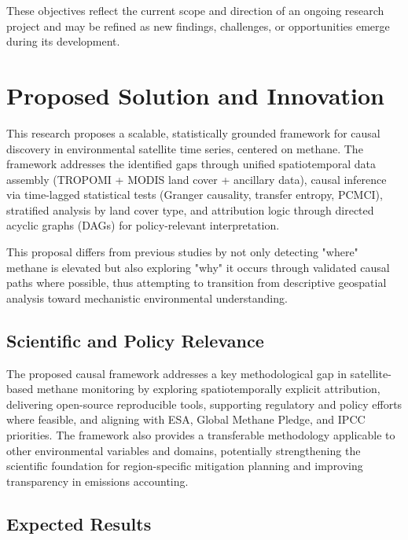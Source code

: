 These objectives reflect the current scope and direction of an ongoing research project and may be refined as new findings, challenges, or opportunities emerge during its development.


\section{Proposed Solution and Innovation}
\label{subsec:proposed-solution}

This research proposes a scalable, statistically grounded framework for causal discovery in environmental satellite time series, centered on methane. The framework addresses the identified gaps through unified spatiotemporal data assembly (TROPOMI  + MODIS land cover + ancillary data), causal inference via time-lagged statistical tests (Granger causality, transfer entropy, PCMCI), stratified analysis by land cover type, and attribution logic through directed acyclic graphs (DAGs) for policy-relevant interpretation.

This proposal differs from previous studies by not only detecting "where" methane is elevated but also exploring "why" it occurs through validated causal paths where possible, thus attempting to transition from descriptive geospatial analysis toward mechanistic environmental understanding.

\subsection{Scientific and Policy Relevance}
\label{subsec:scientific-relevance}

The proposed causal framework addresses a key methodological gap in satellite-based methane monitoring by exploring spatiotemporally explicit attribution, delivering open-source reproducible tools, supporting regulatory and policy efforts where feasible, and aligning with ESA, Global Methane Pledge, and IPCC priorities. The framework also provides a transferable methodology applicable to other environmental variables and domains, potentially strengthening the scientific foundation for region-specific mitigation planning and improving transparency in emissions accounting.

\subsection{Expected Results}

